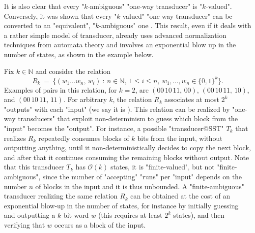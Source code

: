 \documentclass{theoretics}
\begin{document}
It is also clear that every "$k$-ambiguous"
"one-way transducer" is "$k$-valued". 
Conversely, it was shown that every "$k$-valued"
"one-way transducer" can be converted to an 
"equivalent", "$k$-ambiguous" one 
\cite{Weber93,web96,DBLP:journals/mst/SakarovitchS10}.
This result, even if it deals with a rather simple model
of transducer, already uses advanced normalization techniques 
from automata theory and involves an exponential
blow up in the number of states, as shown in the 
example below.

\begin{example}\label{ex:finitevalued}
    Fix $k\in\mathbb{N}$ and consider the relation
    \[
      R_k ~=~ 
      \big\{ 
        (w_1\dots w_n, \, w_i) \::\:
        n\in\mathbb{N}, \: 1\leq i\leq n, \:
        w_1,\dots,w_n \in \{0,1\}^k
      \big\}.
    \]
    Examples of pairs in this relation, for $k=2$, are 
    $(00\,10\,11,\,00)$, 
    $(00\,10\,11,\,10)$, and 
    $(00\,10\,11,\,11)$. 
    \AP
    For arbitrary $k$, the relation $R_k$ 
    associates at most $2^k$ "outputs" with each "input"
    (we say it is ).
    This relation can be realized by "one-way transducers"
    that exploit non-determinism to guess which block from
    the "input" becomes the "output". 
    For instance, a possible "transducer@SST" $T_k$ that realizes $R_k$
    repeatedly consumes blocks of $k$ bits from the input, 
    without outputting anything, until it non-deterministically 
    decides to copy the next block, and after that it 
    continues consuming the remaining blocks without output.
    Note that this transducer $T_k$ has $\mathcal{O}(k)$
    states, it is "finite-valued", but not "finite-ambiguous",
    since the number of "accepting" "runs" per "input" 
    depends on the number $n$ of blocks in the input and it 
    is thus unbounded. 
    A "finite-ambiguous" transducer realizing the same relation
    $R_k$ can be obtained at the cost of an exponential blow-up
    in the number of states, 
    for instance by initially guessing and outputting a $k$-bit
    word $w$ (this requires at least $2^k$ states), 
    and then verifying that $w$ occurs 
    as a block of the input. 
\end{example}
\end{document}
